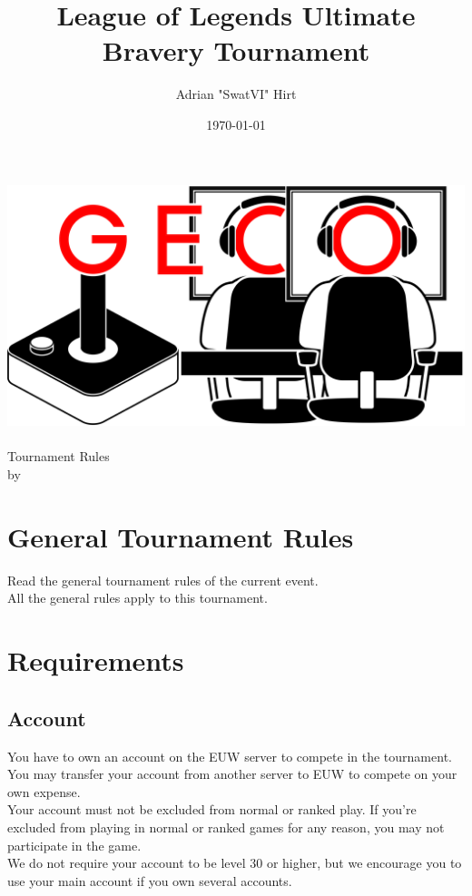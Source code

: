 \documentclass{article}
\title{League of Legends Ultimate Bravery Tournament}
\author{Adrian "SwatVI" Hirt}
\date{\today}
\begin{document}
\makeatletter
\begin{titlepage}
\centering
\includegraphics[scale=0.075]{GECo.png}\\
\LARGE \@title\\ Tournament Rules\\ \normalsize by \@author\\ \@date
\end{titlepage}
\makeatother


\clearpage

\tableofcontents
\clearpage

\section{General Tournament Rules}
Read the general tournament rules of the current event.\\
All the general rules apply to this tournament.

\section{Requirements}
\subsection{Account}
You have to own an account on the EUW server to compete in the tournament. You may transfer your account from another server to EUW to compete on your own expense.
\\
Your account must not be excluded from normal or ranked play. If you're excluded from playing in normal or ranked games for any reason, you may not participate in the game.
\\
We do not require your account to be level 30 or higher, but we encourage you to use your main account if you own several accounts.
\end{document}
